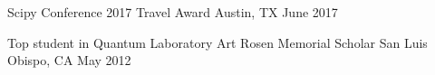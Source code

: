 
\begin{cvpoints}

  \cvpoint
    {Scipy Conference 2017}
    {Travel Award}
    {Austin, TX}
    {June 2017}

  \cvpoint
    {Top student in Quantum Laboratory} %
    {Art Rosen Memorial Scholar} %
    {San Luis Obispo, CA} %
    {May 2012} %

\end{cvpoints}
